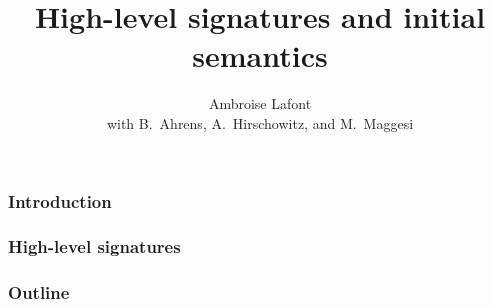 \documentclass[
xcolor=dvipsnames, 
]
{beamer}
\title{High-level signatures and initial semantics}
\author{Ambroise Lafont\\with B.~Ahrens, A.~Hirschowitz, and M.~Maggesi}
\date{}
\institute{CSL 2018, University of Birmingham, UK}
\newcommand{\outlinetitle}{Outline}
\theoremstyle{definition}
\begin{document}
\begin{frame}
 \titlepage
\end{frame}


\begin{frame}
 \frametitle{Introduction}
\end{frame}

\begin{frame}
 \frametitle{High-level signatures}
\end{frame}


\begin{frame}
 \frametitle{\outlinetitle}
 \tableofcontents
\end{frame}
\end{document}
